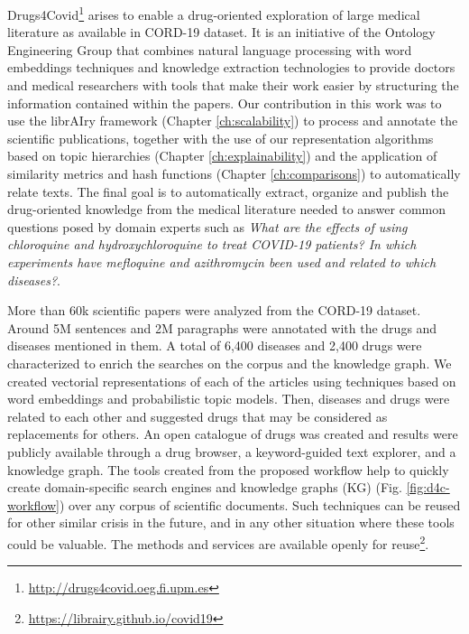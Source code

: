 Drugs4Covid\footnote{\url{http://drugs4covid.oeg.fi.upm.es}} arises to enable a drug-oriented exploration of large medical literature as available in CORD-19 dataset. It is an initiative of the Ontology Engineering Group that combines natural language processing with word embeddings techniques and knowledge extraction technologies to provide doctors and medical researchers with tools that make their work easier by structuring the information contained within the papers. Our contribution in this work was to use the librAIry framework (Chapter \ref{ch:scalability}) to process and annotate the scientific publications, together with the use of our representation algorithms based on topic hierarchies (Chapter \ref{ch:explainability}) and the application of similarity metrics and hash functions (Chapter \ref{ch:comparisons}) to automatically relate texts. The final goal is to automatically extract, organize and publish the drug-oriented knowledge from the medical literature needed to answer common questions posed by domain experts such as \textit{What are the effects of using chloroquine and hydroxychloroquine to treat COVID-19 patients? In which experiments have mefloquine and azithromycin been used and related to which diseases?}.  

More than 60k scientific papers were analyzed from the CORD-19 dataset. Around 5M sentences and 2M paragraphs were annotated with the drugs and diseases mentioned in them. A total of 6,400 diseases and 2,400 drugs were characterized to enrich the searches on the corpus and the knowledge graph. We created vectorial representations of each of the articles using techniques based on word embeddings and probabilistic topic models. Then, diseases and drugs were related to each other and suggested drugs that may be considered as replacements for others. An open catalogue of drugs was created and results were publicly available through a drug browser, a keyword-guided text explorer, and a knowledge graph. The tools created from the proposed workflow help to quickly create domain-specific search engines and knowledge graphs (KG) (Fig. \ref{fig:d4c-workflow}) over any corpus of scientific documents. Such techniques can be reused for other similar crisis in the future, and in any other situation where these tools could be valuable. The methods and services are available openly for reuse\footnote{\url{https://librairy.github.io/covid19}}. 









